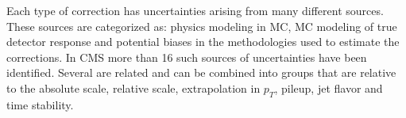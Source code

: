 Each type of correction has uncertainties arising from many different sources.
These sources are categorized as: physics modeling in MC, MC modeling of true detector response and potential biases in the methodologies used to estimate the corrections. In CMS more than 16 such sources of uncertainties have been identified. Several are
related and can be combined into groups that are relative to the absolute scale, relative
scale, extrapolation in $p_T$, pileup, jet flavor and time stability.
